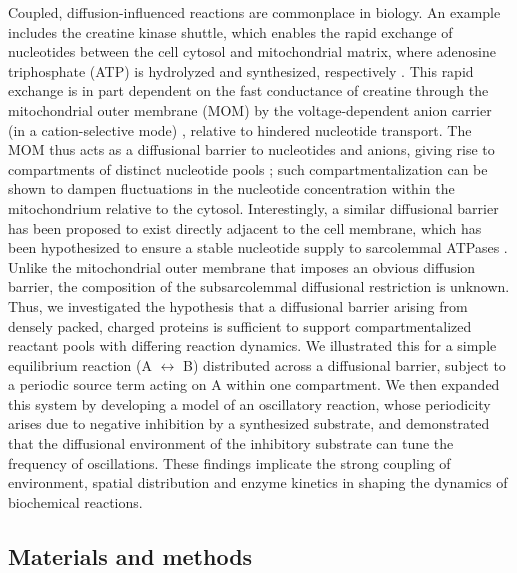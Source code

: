 Coupled, diffusion-influenced reactions are commonplace in biology. 
An example includes the creatine kinase shuttle, which enables the rapid exchange of nucleotides between the cell cytosol and mitochondrial matrix, where adenosine triphosphate (ATP) is hydrolyzed and synthesized, respectively \cite{vanBeek:2007gr}. 
This rapid exchange is in part dependent on the fast conductance of creatine through the mitochondrial outer membrane (MOM) by the voltage-dependent anion carrier (in a cation-selective mode) \cite{Anonymous:afLDblo3}, relative to hindered nucleotide transport.
The MOM thus acts as a diffusional barrier to nucleotides and anions, giving rise to compartments of distinct nucleotide pools \cite{Anonymous:afLDblo3}; such compartmentalization can be shown to dampen fluctuations in the nucleotide concentration within the mitochondrium relative to the cytosol. %
Interestingly, a similar diffusional barrier has been proposed to exist directly adjacent to the cell membrane, which has been hypothesized to ensure a stable nucleotide supply to sarcolemmal ATPases \cite{Alekseev:2011wc}. 
Unlike the mitochondrial outer membrane that imposes an obvious diffusion barrier, the composition of the subsarcolemmal diffusional restriction is unknown. %
Thus, we investigated the hypothesis that a diffusional barrier arising from densely packed, charged
proteins is sufficient to support compartmentalized reactant pools with differing reaction dynamics.
We illustrated this for a simple equilibrium reaction (A $\leftrightarrow$ B) distributed across a
diffusional barrier, subject to a periodic source term acting on A within one compartment.
We then expanded this system by developing a model of an oscillatory reaction, whose periodicity arises due
to negative inhibition by a synthesized substrate, and demonstrated that the diffusional environment of the inhibitory substrate can tune the frequency of oscillations. 
These findings implicate the strong coupling of environment, spatial distribution and enzyme kinetics in shaping the dynamics of biochemical reactions. 


\subsection{Materials and methods}
